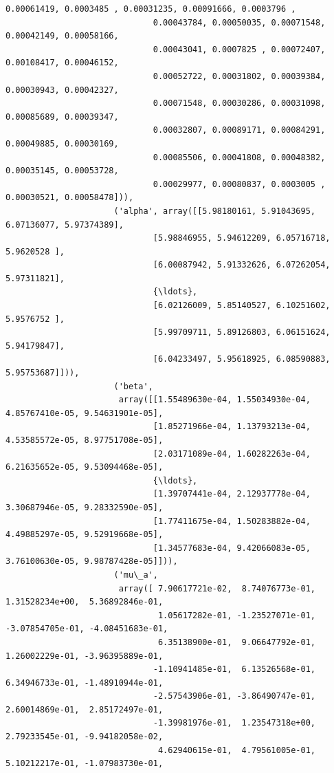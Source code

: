 \documentclass[11pt]{article}
\begin{document}
\begin{Verbatim}[commandchars=\\\{\}]
                              0.00061419, 0.0003485 , 0.00031235, 0.00091666, 0.0003796 ,
                              0.00043784, 0.00050035, 0.00071548, 0.00042149, 0.00058166,
                              0.00043041, 0.0007825 , 0.00072407, 0.00108417, 0.00046152,
                              0.00052722, 0.00031802, 0.00039384, 0.00030943, 0.00042327,
                              0.00071548, 0.00030286, 0.00031098, 0.00085689, 0.00039347,
                              0.00032807, 0.00089171, 0.00084291, 0.00049885, 0.00030169,
                              0.00085506, 0.00041808, 0.00048382, 0.00035145, 0.00053728,
                              0.00029977, 0.00080837, 0.0003005 , 0.00030521, 0.00058478])),
                      ('alpha', array([[5.98180161, 5.91043695, 6.07136077, 5.97374389],
                              [5.98846955, 5.94612209, 6.05716718, 5.9620528 ],
                              [6.00087942, 5.91332626, 6.07262054, 5.97311821],
                              {\ldots},
                              [6.02126009, 5.85140527, 6.10251602, 5.9576752 ],
                              [5.99709711, 5.89126803, 6.06151624, 5.94179847],
                              [6.04233497, 5.95618925, 6.08590883, 5.95753687]])),
                      ('beta',
                       array([[1.55489630e-04, 1.55034930e-04, 4.85767410e-05, 9.54631901e-05],
                              [1.85271966e-04, 1.13793213e-04, 4.53585572e-05, 8.97751708e-05],
                              [2.03171089e-04, 1.60282263e-04, 6.21635652e-05, 9.53094468e-05],
                              {\ldots},
                              [1.39707441e-04, 2.12937778e-04, 3.30687946e-05, 9.28332590e-05],
                              [1.77411675e-04, 1.50283882e-04, 4.49885297e-05, 9.52919668e-05],
                              [1.34577683e-04, 9.42066083e-05, 3.76100630e-05, 9.98787428e-05]])),
                      ('mu\_a',
                       array([ 7.90617721e-02,  8.74076773e-01,  1.31528234e+00,  5.36892846e-01,
                               1.05617282e-01, -1.23527071e-01, -3.07854705e-01, -4.08451683e-01,
                               6.35138900e-01,  9.06647792e-01,  1.26002229e-01, -3.96395889e-01,
                              -1.10941485e-01,  6.13526568e-01,  6.34946733e-01, -1.48910944e-01,
                              -2.57543906e-01, -3.86490747e-01,  2.60014869e-01,  2.85172497e-01,
                              -1.39981976e-01,  1.23547318e+00,  2.79233545e-01, -9.94182058e-02,
                               4.62940615e-01,  4.79561005e-01,  5.10212217e-01, -1.07983730e-01,

\end{Verbatim}
\end{document}
